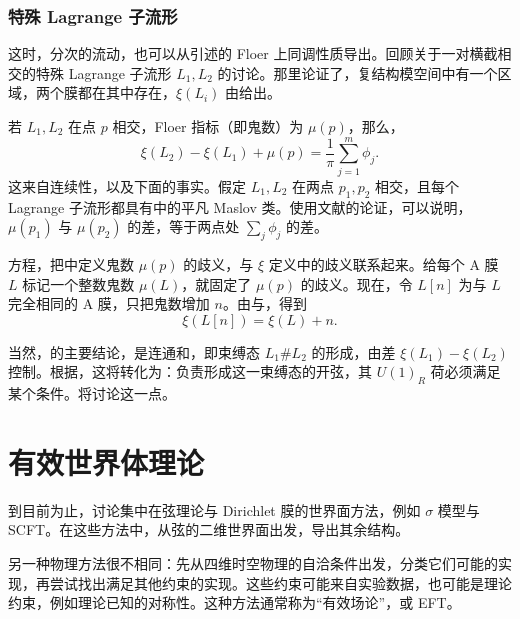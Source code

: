 \subsubsection{特殊 Lagrange 子流形}\label{sec:5.3.6.1}

这时，分次的流动，也可以从引述的 Floer 上同调性质导出。回顾关于一对横截相交的特殊 Lagrange 子流形 $L_1,L_2$ 的讨论。那里论证了，复结构模空间中有一个区域，两个膜都在其中存在，$\xi(L_i)$ 由给出。

若 $L_1,L_2$ 在点 $p$ 相交，Floer 指标（即鬼数）为 $\mu(p)$，那么，
\begin{equation}\label{eq:5.73}
\xi(L_2)-\xi(L_1)+\mu(p)=\frac{1}{\pi}\sum_{j=1}^m\phi_j.
\end{equation}
这来自连续性，以及下面的事实。假定 $L_1,L_2$ 在两点 $p_1,p_2$ 相交，且每个 Lagrange 子流形都具有中的平凡 Maslov 类。使用文献的论证，可以说明，$\mu(p_1)$ 与 $\mu(p_2)$ 的差，等于两点处 $\sum_j\phi_j$ 的差。

方程，把中定义鬼数 $\mu(p)$ 的歧义，与 $\xi$ 定义中的歧义联系起来。给每个 A 膜 $L$ 标记一个整数鬼数 $\mu(L)$，就固定了 $\mu(p)$ 的歧义。现在，令 $L[n]$ 为与 $L$ 完全相同的 A 膜，只把鬼数增加 $n$。由与，得到
\begin{equation}\label{eq:5.74}
\xi(L[n])=\xi(L)+n.
\end{equation}

当然，的主要结论，是连通和，即束缚态 $L_1\#L_2$ 的形成，由差 $\xi(L_1)-\xi(L_2)$ 控制。根据，这将转化为：负责形成这一束缚态的开弦，其 $U(1)_R$ 荷必须满足某个条件。将讨论这一点。

\section{有效世界体理论}\label{sec:5.4}

到目前为止，讨论集中在弦理论与 Dirichlet 膜的世界面方法，例如 $\sigma$ 模型与 SCFT。在这些方法中，从弦的二维世界面出发，导出其余结构。

另一种物理方法很不相同：先从四维时空物理的自洽条件出发，分类它们可能的实现，再尝试找出满足其他约束的实现。这些约束可能来自实验数据，也可能是理论约束，例如理论已知的对称性。这种方法通常称为“有效场论”，或 EFT。

